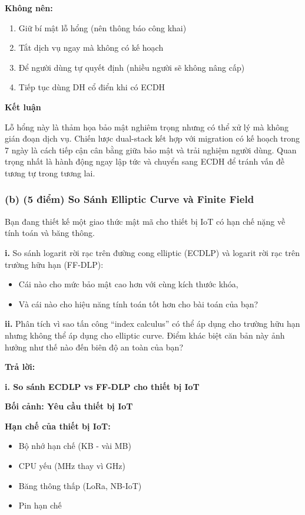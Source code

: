 \textbf{Không nên:}
\begin{enumerate}
    \item Giữ bí mật lỗ hổng (nên thông báo công khai)
    \item Tắt dịch vụ ngay mà không có kế hoạch
    \item Để người dùng tự quyết định (nhiều người sẽ không nâng cấp)
    \item Tiếp tục dùng DH cổ điển khi có ECDH
\end{enumerate}

\vspace{0.2cm}

\textbf{Kết luận}

Lỗ hổng này là thảm họa bảo mật nghiêm trọng nhưng có thể xử lý mà không gián đoạn dịch vụ. Chiến lược dual-stack kết hợp với migration có kế hoạch trong 7 ngày là cách tiếp cận cân bằng giữa bảo mật và trải nghiệm người dùng. Quan trọng nhất là hành động ngay lập tức và chuyển sang ECDH để tránh vấn đề tương tự trong tương lai.

\subsubsection{(b) (5 điểm) So Sánh Elliptic Curve và Finite Field}

Bạn đang thiết kế một giao thức mật mã cho thiết bị IoT có hạn chế nặng về tính toán và băng thông.

\textbf{i.} So sánh logarit rời rạc trên đường cong elliptic (ECDLP) và logarit rời rạc trên trường hữu hạn (FF-DLP):
\begin{itemize}
    \item Cái nào cho mức bảo mật cao hơn với cùng kích thước khóa,
    \item Và cái nào cho hiệu năng tính toán tốt hơn cho bài toán của bạn?
\end{itemize}

\textbf{ii.} Phân tích vì sao tấn công ``index calculus'' có thể áp dụng cho trường hữu hạn nhưng không thể áp dụng cho elliptic curve.
Điểm khác biệt căn bản này ảnh hưởng như thế nào đến biên độ an toàn của bạn?

\begin{center}
    \textbf{Trả lời:}
\end{center}

\textbf{i. So sánh ECDLP vs FF-DLP cho thiết bị IoT}

\textbf{Bối cảnh: Yêu cầu thiết bị IoT}

\textbf{Hạn chế của thiết bị IoT:}
\begin{itemize}
    \item Bộ nhớ hạn chế (KB - vài MB)
    \item CPU yếu (MHz thay vì GHz)
    \item Băng thông thấp (LoRa, NB-IoT)
    \item Pin hạn chế
\end{itemize}


